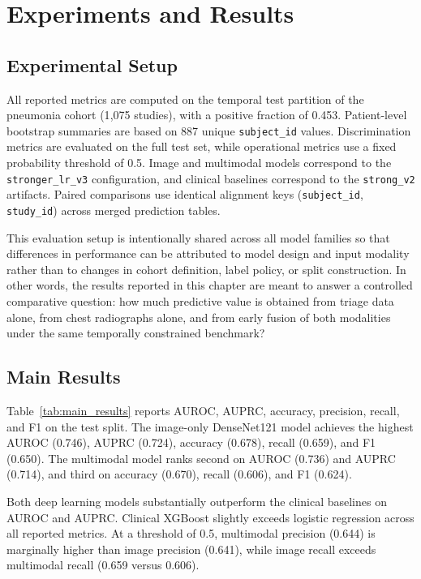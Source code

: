 \chapter{Experiments and Results}

\section{Experimental Setup}

All reported metrics are computed on the temporal test partition of the pneumonia cohort (1{,}075 studies), with a positive fraction of 0.453. Patient-level bootstrap summaries are based on 887 unique \texttt{subject\_id} values. Discrimination metrics are evaluated on the full test set, while operational metrics use a fixed probability threshold of 0.5. Image and multimodal models correspond to the \texttt{stronger\_lr\_v3} configuration, and clinical baselines correspond to the \texttt{strong\_v2} artifacts. Paired comparisons use identical alignment keys (\texttt{subject\_id}, \texttt{study\_id}) across merged prediction tables.

This evaluation setup is intentionally shared across all model families so that differences in performance can be attributed to model design and input modality rather than to changes in cohort definition, label policy, or split construction. In other words, the results reported in this chapter are meant to answer a controlled comparative question: how much predictive value is obtained from triage data alone, from chest radiographs alone, and from early fusion of both modalities under the same temporally constrained benchmark?

\section{Main Results}

Table~\ref{tab:main_results} reports AUROC, AUPRC, accuracy, precision, recall, and F1 on the test split. The image-only DenseNet121 model achieves the highest AUROC (0.746), AUPRC (0.724), accuracy (0.678), recall (0.659), and F1 (0.650). The multimodal model ranks second on AUROC (0.736) and AUPRC (0.714), and third on accuracy (0.670), recall (0.606), and F1 (0.624).

Both deep learning models substantially outperform the clinical baselines on AUROC and AUPRC. Clinical XGBoost slightly exceeds logistic regression across all reported metrics. At a threshold of 0.5, multimodal precision (0.644) is marginally higher than image precision (0.641), while image recall exceeds multimodal recall (0.659 versus 0.606).

